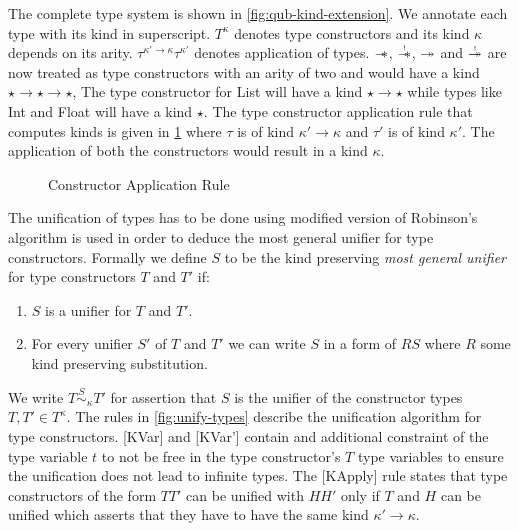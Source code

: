 The complete type system is shown in \cref{fig:qub-kind-extension}. We annotate each type with its kind
in superscript.  $T^\kappa$ denotes type constructors and its kind $\kappa$ depends on its arity.
$\tau^{\kappa' \rightarrow \kappa}\tau^{\kappa'}$ denotes application of types.
$\sepimp$, $\tightoverset{\scalebox{0.5}{!}}{\sepimp}$, $\shimp$ and $\tightoverset{\scalebox{0.5}{!}}{\shimp}$
are now treated as type constructors with an arity of two and would have a kind $\star \rightarrow \star \rightarrow \star$, The
type constructor for List will have a kind $\star \rightarrow \star$ while types like Int and Float will have a kind $\star$.
The type constructor application rule that computes kinds is given in \cref{fig:constructor-application} where
$\tau$ is of kind $\kappa' \rightarrow \kappa$ and $\tau'$ is of kind $\kappa'$. The application
of both the constructors would result in a kind $\kappa$.

\begin{figure}
  \begin{framed}
    \begin{prooftree}
    \end{prooftree}
  \end{framed}
  \caption{Constructor Application Rule}
  \label{fig:constructor-application}
\end{figure}

The unification of types has to be done using modified version of Robinson's algorithm\citeyearpar{robinson_machine-oriented_1965}
is used in order to deduce the most general unifier for type constructors.
Formally we define $S$ to be the kind preserving {\it most general unifier} for type constructors $T$ and $T'$ if:
\begin{enumerate}
  \item $S$ is a unifier for $T$ and $T'$.
  \item For every unifier $S'$ of $T$ and $T'$ we can write $S$ in a form of
    $R S$ where $R$ some kind preserving substitution.
\end{enumerate}
We write $T \overset{S}{\sim}_{\kappa} T'$ for assertion that $S$ is the unifier
of the constructor types $T, T' \in T^{\kappa}$. The rules in \cref{fig:unify-types}
describe the unification algorithm for type constructors. [KVar] and [KVar'] contain
and additional constraint of the type variable $t$ to not be free in the type constructor's $T$
type variables to ensure the unification does not lead to infinite types. The [KApply] rule
states that type constructors of the form $T T'$ can be unified with $H H'$ only if $T$ and $H$
can be unified which asserts that they have to have the same kind $\kappa' \rightarrow \kappa$.

